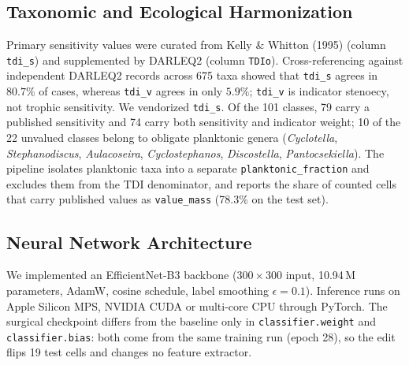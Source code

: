 \documentclass[10pt,twocolumn,a4paper]{article}
\begin{document}
\subsection{Taxonomic and Ecological Harmonization}
Primary sensitivity values were curated from Kelly \& Whitton (1995) \cite{kelly1995trophic} (column \texttt{tdi\_s}) and supplemented by DARLEQ2 \cite{kelly2008assessment} (column \texttt{TDIo}). Cross-referencing against independent DARLEQ2 records across 675 taxa showed that \texttt{tdi\_s} agrees in $80.7\%$ of cases, whereas \texttt{tdi\_v} agrees in only $5.9\%$; \texttt{tdi\_v} is indicator stenoecy, not trophic sensitivity. We vendorized \texttt{tdi\_s}. Of the 101 classes, 79 carry a published sensitivity and 74 carry both sensitivity and indicator weight; 10 of the 22 unvalued classes belong to obligate planktonic genera (\textit{Cyclotella}, \textit{Stephanodiscus}, \textit{Aulacoseira}, \textit{Cyclostephanos}, \textit{Discostella}, \textit{Pantocsekiella}). The pipeline isolates planktonic taxa into a separate \texttt{planktonic\_fraction} and excludes them from the TDI denominator, and reports the share of counted cells that carry published values as \texttt{value\_mass} (78.3\% on the test set).

\subsection{Neural Network Architecture}
We implemented an EfficientNet-B3 backbone \cite{tan2019efficientnet} ($300 \times 300$ input, 10.94\,M parameters, AdamW, cosine schedule, label smoothing $\epsilon = 0.1$). Inference runs on Apple Silicon MPS, NVIDIA CUDA or multi-core CPU through PyTorch. The surgical checkpoint differs from the baseline only in \texttt{classifier.weight} and \texttt{classifier.bias}: both come from the same training run (epoch 28), so the edit flips 19 test cells and changes no feature extractor.
\end{document}
